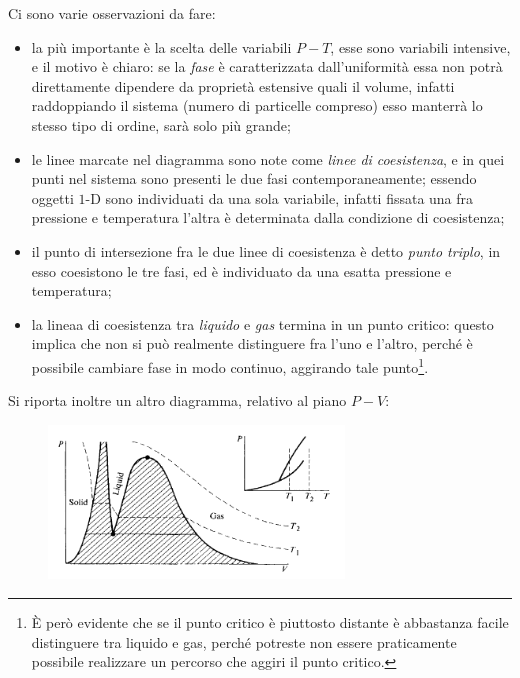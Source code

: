 Ci sono varie osservazioni da fare:
\begin{itemize}
	\item la più importante è la scelta delle variabili $P-T$, esse sono variabili intensive, e il motivo è chiaro: se la \textit{fase} è caratterizzata dall'uniformità essa non potrà direttamente dipendere da proprietà estensive quali il volume, infatti raddoppiando il sistema (numero di particelle compreso) esso manterrà lo stesso tipo di ordine, sarà solo più grande;
	\item le linee marcate nel diagramma sono note come \textit{linee di coesistenza}, e in quei punti nel sistema sono presenti le due fasi contemporaneamente; essendo oggetti $1$-D sono individuati da una sola variabile, infatti fissata una fra pressione e temperatura l'altra è determinata dalla condizione di coesistenza;
\end{itemize}

\begin{itemize}
	\item il punto di intersezione fra le due linee di coesistenza è detto \textit{punto triplo}, in esso coesistono le tre fasi, ed è individuato da una esatta pressione e temperatura;
	\item la lineaa di coesistenza tra \textit{liquido} e \textit{gas} termina in un punto critico: questo implica che non si può realmente distinguere fra l'uno e l'altro, perché è possibile cambiare fase in modo continuo, aggirando tale punto\footnote{\`E però evidente che se il punto critico è piuttosto distante è abbastanza facile distinguere tra liquido e gas, perché potreste non essere praticamente possibile realizzare un percorso che aggiri il punto critico.}.
\end{itemize}

Si riporta inoltre un altro diagramma, relativo al piano $P-V$:

\begin{figure}[H]
	\centering
	\includegraphics[width=0.7\textwidth]{Immagini/PhasePV.png}
	\caption{}
	\label{fig:phasepv}
\end{figure}

